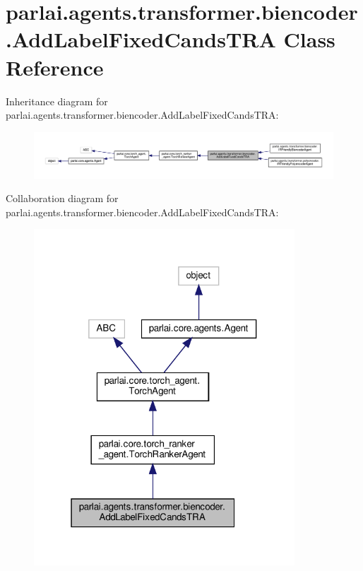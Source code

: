 \hypertarget{classparlai_1_1agents_1_1transformer_1_1biencoder_1_1AddLabelFixedCandsTRA}{}\section{parlai.\+agents.\+transformer.\+biencoder.\+Add\+Label\+Fixed\+Cands\+T\+RA Class Reference}
\label{classparlai_1_1agents_1_1transformer_1_1biencoder_1_1AddLabelFixedCandsTRA}


Inheritance diagram for parlai.\+agents.\+transformer.\+biencoder.\+Add\+Label\+Fixed\+Cands\+T\+RA\+:\nopagebreak
\begin{figure}[H]
\begin{center}
\leavevmode
\includegraphics[width=350pt]{df/ddc/classparlai_1_1agents_1_1transformer_1_1biencoder_1_1AddLabelFixedCandsTRA__inherit__graph}
\end{center}
\end{figure}


Collaboration diagram for parlai.\+agents.\+transformer.\+biencoder.\+Add\+Label\+Fixed\+Cands\+T\+RA\+:
\nopagebreak
\begin{figure}[H]
\begin{center}
\leavevmode
\includegraphics[width=277pt]{de/d98/classparlai_1_1agents_1_1transformer_1_1biencoder_1_1AddLabelFixedCandsTRA__coll__graph}
\end{center}
\end{figure}
